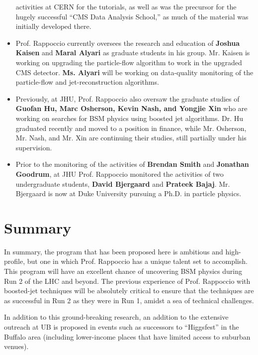 \documentclass[12pt]{proposalnsf}
\begin{document}
\begin{itemize}
  activities at CERN for the tutorials, as well as was the precursor
  for the hugely successful ``CMS Data Analysis School,'' as much of
  the material was initially developed there. 
\item Prof. Rappoccio currently oversees the research and education of {\bf Joshua
    Kaisen} and {\bf Maral Alyari} as graduate students in his
  group. Mr. Kaisen is working on upgrading the particle-flow
  algorithm to work in the upgraded CMS detector. {\bf Ms. Alyari}
  will be working on data-quality monitoring of the particle-flow and
  jet-reconstruction algorithms.
\item Previously, at JHU, Prof. Rappoccio also oversaw the graduate studies of 
  {\bf Guofan Hu, Marc Osherson, Kevin Nash, and Yongjie Xin} who are
  working on searches for BSM physics using boosted jet
  algorithms. Dr. Hu graduated recently and moved to a position in
  finance, while Mr. Osherson, Mr. Nash, and Mr. Xin are continuing
  their studies, still partially under his supervision. 
\item Prior to the monitoring of the activities of {\bf Brendan Smith} and 
  {\bf Jonathan Goodrum}, at JHU Prof. Rappoccio monitored the activities of two
  undergraduate students, 
  {\bf David Bjergaard} and {\bf Prateek Bajaj}. Mr. Bjergaard is now
  at Duke University pursuing a Ph.D. in particle physics. 
\end{itemize}

\section{Summary}

In summary, the program that has been proposed here is ambitious and
high-profile, but one in which Prof. Rappoccio has a unique talent set to
accomplish. This program will have an excellent chance of uncovering BSM
physics during Run 2 of the LHC and beyond. The previous experience of
Prof. Rappoccio with
boosted-jet techniques will be absolutely critical to ensure that the
techniques are as successful in Run 2 as they were in Run 1, amidst a
sea of technical challenges. 

In addition to this ground-breaking research, an addition to the
extensive outreach at UB is proposed in
events such as successors to ``Higgsfest'' in the Buffalo
area (including lower-income places that have limited access to
suburban venues). 

\newpage
{}
\renewcommand{\thepage} {A--\arabic{page}}
\end{document}
